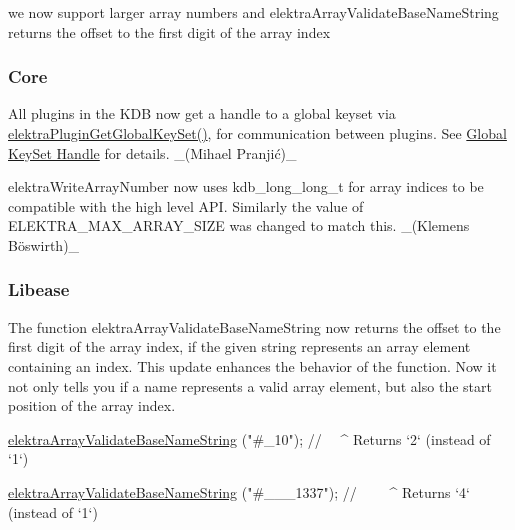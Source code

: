 \begin{DoxyItemize}
\item we now support larger array numbers and {\ttfamily elektra\+Array\+Validate\+Base\+Name\+String} returns the offset to the first digit of the array index
\end{DoxyItemize}

\subsubsection*{Core}


\begin{DoxyItemize}
\item All plugins in the K\+DB now get a handle to a global keyset via {\ttfamily \hyperlink{group__plugin_ga436cda13ed70c0face08661a90620bf6}{elektra\+Plugin\+Get\+Global\+Key\+Set()}}, for communication between plugins. See \hyperlink{doc_decisions_global_keyset_md}{Global Key\+Set Handle} for details. \+\_\+(Mihael Pranjić)\+\_\+
\item {\ttfamily elektra\+Write\+Array\+Number} now uses {\ttfamily kdb\+\_\+long\+\_\+long\+\_\+t} for array indices to be compatible with the high level A\+PI. Similarly the value of {\ttfamily E\+L\+E\+K\+T\+R\+A\+\_\+\+M\+A\+X\+\_\+\+A\+R\+R\+A\+Y\+\_\+\+S\+I\+ZE} was changed to match this. \+\_\+(Klemens Böswirth)\+\_\+
\end{DoxyItemize}

\subsubsection*{Libease}


\begin{DoxyItemize}
\item The function {\ttfamily elektra\+Array\+Validate\+Base\+Name\+String} now returns the offset to the first digit of the array index, if the given string represents an array element containing an index. This update enhances the behavior of the function. Now it not only tells you if a name represents a valid array element, but also the start position of the array index.
\end{DoxyItemize}


\begin{DoxyCode}
\hyperlink{array_8c_ab2eb25a64ded91feb47e58af8e62314a}{elektraArrayValidateBaseNameString} (\textcolor{stringliteral}{"#\_10"});
\textcolor{comment}{//                                     ~~^ Returns `2` (instead of `1`)}

\hyperlink{array_8c_ab2eb25a64ded91feb47e58af8e62314a}{elektraArrayValidateBaseNameString} (\textcolor{stringliteral}{"#\_\_\_1337"});
\textcolor{comment}{//                                   ~~~~^ Returns `4` (instead of `1`)}
\end{DoxyCode}


